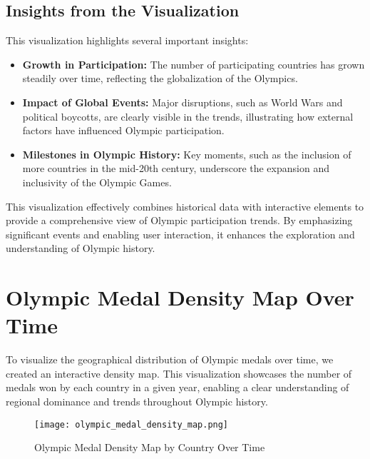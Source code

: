 \subsection{Insights from the Visualization}
This visualization highlights several important insights:
\begin{itemize}
    \item \textbf{Growth in Participation:} The number of participating countries has grown steadily over time, reflecting the globalization of the Olympics.
    \item \textbf{Impact of Global Events:} Major disruptions, such as World Wars and political boycotts, are clearly visible in the trends, illustrating how external factors have influenced Olympic participation.
    \item \textbf{Milestones in Olympic History:} Key moments, such as the inclusion of more countries in the mid-20th century, underscore the expansion and inclusivity of the Olympic Games.
\end{itemize}

This visualization effectively combines historical data with interactive elements to provide a comprehensive view of Olympic participation trends. By emphasizing significant events and enabling user interaction, it enhances the exploration and understanding of Olympic history.

\section{Olympic Medal Density Map Over Time}

To visualize the geographical distribution of Olympic medals over time, we created an interactive density map. This visualization showcases the number of medals won by each country in a given year, enabling a clear understanding of regional dominance and trends throughout Olympic history.

\begin{figure}[ht]
    \centering
    \texttt{[image: olympic\_medal\_density\_map.png]}
    \caption{Olympic Medal Density Map by Country Over Time}
    \label{fig:medal_density_map}
\end{figure}

